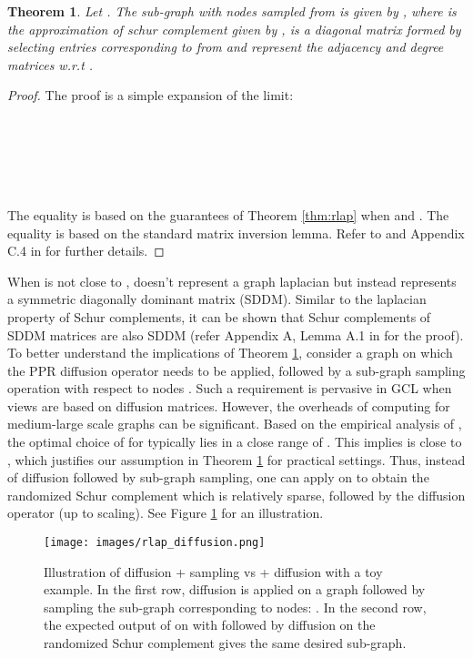 \documentclass{article}
\theoremstyle{plain}
\newtheorem{theorem}{Theorem}[section]
\theoremstyle{definition}
\theoremstyle{remark}
\begin{document}
\begin{theorem}
\label{thm:theta_schur}
Let . The sub-graph with nodes  sampled from  is given by , where  is the approximation of schur complement  given by ,  is a diagonal matrix formed by selecting entries corresponding to  from  and  represent the adjacency and degree matrices w.r.t .
\end{theorem}
\begin{proof}
The proof is a simple expansion of the limit:

 \\ 
\\ 
\\
\\
 \\


The equality 
is based on the guarantees of Theorem \ref{thm:rlap} when  and . The equality  is based on the standard matrix inversion lemma. Refer to \citet{gallier2010notes} and Appendix C.4 in \citet{boyd2004convex} for further details.
\end{proof}

When  is not close to ,  doesn't represent a graph laplacian but instead represents a symmetric diagonally dominant matrix (SDDM). Similar to the laplacian property of Schur complements, it can be shown that Schur complements of SDDM matrices are also SDDM (refer Appendix A, Lemma A.1 in \citet{fahrbach2020faster} for the proof). To better understand the implications of Theorem \ref{thm:theta_schur}, consider a graph  on which the PPR diffusion operator needs to be applied, followed by a sub-graph sampling operation with respect to nodes . Such a requirement is pervasive in GCL when views are based on diffusion matrices. However, the overheads of computing  for medium-large scale graphs can be significant. Based on the empirical analysis of \citet{klicpera2019diffusion}, the optimal choice of  for  typically lies in a close range of . This implies  is close to , which justifies our assumption in Theorem \ref{thm:theta_schur} for practical settings. Thus, instead of diffusion followed by sub-graph sampling, one can apply  on  to obtain the randomized Schur complement which is relatively sparse, followed by the diffusion operator (up to  scaling). See Figure \ref{fig:rlap_diffusion} for an illustration.


\begin{figure}[ht]
\vskip 0.2in
\centering
\centerline{\texttt{[image: images/rlap\_diffusion.png]}}
\caption{Illustration of diffusion + sampling vs  + diffusion with a toy example. In the first row, diffusion is applied on a graph  followed by sampling the sub-graph corresponding to nodes: . In the second row, the expected output of  on  with  followed by diffusion on the randomized Schur complement gives the same desired sub-graph.} 
\label{fig:rlap_diffusion}
\vskip -0.2in
\end{figure}
\end{document}
